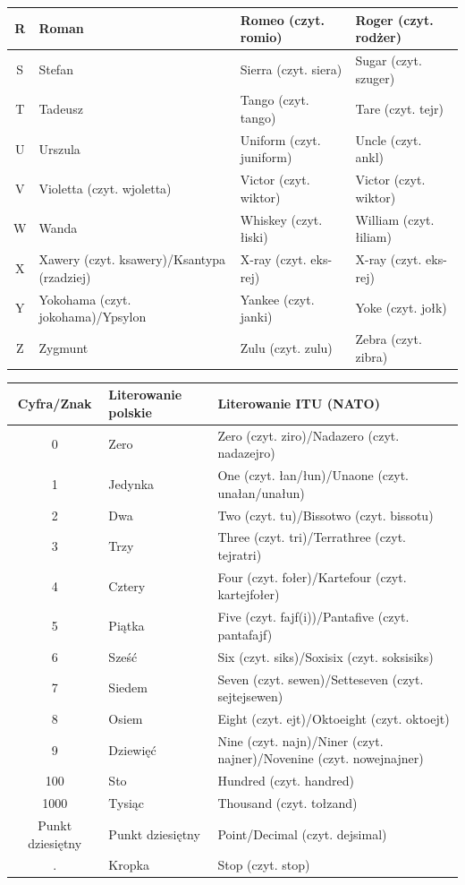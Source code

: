 \documentclass[a4paper,11pt]{article}
\begin{document}
\begin{center}
\begin{tabular}{| c | p{4cm} | p{4cm} | p{4cm} |}
R & Roman & Romeo (czyt. romio) & Roger (czyt. rodżer) \\ \hline
S & Stefan & Sierra (czyt. siera) & Sugar (czyt. szuger) \\ \hline
T & Tadeusz & Tango (czyt. tango) & Tare (czyt. tejr) \\ \hline
U & Urszula & Uniform (czyt. juniform) & Uncle (czyt. ankl) \\ \hline
V & Violetta (czyt. wjoletta) & Victor (czyt. wiktor) & Victor (czyt. wiktor) \\ \hline
W & Wanda & Whiskey (czyt. łiski) & William (czyt. łiliam) \\ \hline
X & Xawery (czyt. ksawery)/Ksantypa (rzadziej) & X-ray (czyt. eks-rej) & X-ray (czyt. eks-rej) \\ \hline
Y & Yokohama (czyt. jokohama)/Ypsylon & Yankee (czyt. janki) & Yoke (czyt. jołk) \\ \hline
Z & Zygmunt & Zulu (czyt. zulu) & Zebra (czyt. zibra) \\ \hline
\end{tabular}
\end{center}
\begin{center}
\begin{tabular}{| c | p{4cm} | p{4cm} |}
\hline
\textbf{Cyfra/Znak} & \textbf{Literowanie polskie} & \textbf{Literowanie ITU (NATO)} \\ \hline
0 & Zero & Zero (czyt. ziro)/Nadazero (czyt. nadazejro) \\ \hline
1 & Jedynka & One (czyt. łan/łun)/Unaone (czyt. unałan/unałun) \\ \hline
2 & Dwa & Two (czyt. tu)/Bissotwo (czyt. bissotu) \\ \hline
3 & Trzy & Three (czyt. tri)/Terrathree (czyt. tejratri) \\ \hline
4 & Cztery & Four (czyt. fołer)/Kartefour (czyt. kartejfołer) \\ \hline
5 & Piątka & Five (czyt. fajf(i))/Pantafive (czyt. pantafajf) \\ \hline
6 & Sześć & Six (czyt. siks)/Soxisix (czyt. soksisiks) \\ \hline
7 & Siedem & Seven (czyt. sewen)/Setteseven (czyt. sejtejsewen) \\ \hline
8 & Osiem & Eight (czyt. ejt)/Oktoeight (czyt. oktoejt) \\ \hline
9 & Dziewięć & Nine (czyt. najn)/Niner (czyt. najner)/Novenine (czyt. nowejnajner) \\ \hline
100 & Sto & Hundred (czyt. handred) \\ \hline
1000 & Tysiąc & Thousand (czyt. tołzand) \\ \hline
Punkt dziesiętny & Punkt dziesiętny & Point/Decimal (czyt. dejsimal) \\ \hline
. & Kropka & Stop (czyt. stop) \\ \hline
\end{tabular}
\end{center}
\end{document}
